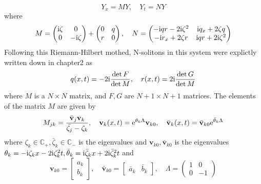 \begin{equation}
    Y_{x} = MY, \quad Y_{t} = NY
\end{equation}
where 
\begin{equation}
    M = \begin{pmatrix}
        \mathrm{i} \zeta & 0 \\
        0 & -\mathrm{i} \zeta
    \end{pmatrix} + \begin{pmatrix}
        0 & q \\
        r & 0
    \end{pmatrix}, 
    \quad N = \begin{pmatrix}
        - \mathrm{i} qr - 2 \mathrm{i} \zeta^{2} & \mathrm{i} q_{x} +2 \zeta q \\
        -\mathrm{i} r_{x} + 2 \zeta r  &  \mathrm{i} q r + 2 \mathrm{i} \zeta^{2}
    \end{pmatrix}
\end{equation}
Following this Riemann-Hilbert mothed, N-solitons in this system were explictly written down in chapter2 as 
\begin{equation}
    q(x,t) = -2 \mathrm{i} \frac{\det F}{\det M}, \quad r(x,t) = 2 \mathrm{i} \frac{\det G}{\det M} \label{eq:soliton-coupled-NLS}
\end{equation}
where $ M $ is a $ N \times N $ matrix, and $ F, G $ are $ N+1 \times N+1 $ matrices. The elements of the matrix $ M $ are given by
\begin{equation}
    M_{jk} = \frac{\bar{\mathbf{v}}_{j}\mathbf{v}_{k}}{\bar{\zeta_{j}}-\zeta_{k}}, \quad \mathbf{v}_{k}(x,t)= \mathrm{e}^{\theta_{k}\Lambda} \mathbf{v}_{k0}, \quad \bar{\mathbf{v}}_{k}(x,t) = \bar{\mathbf{v}}_{k0}\mathrm{e}^{\bar{\theta}_{k}\Lambda} 
\end{equation}
where $\zeta_{k} \in \mathbb{C}_{+}, \bar{\zeta}_{k} \in \mathbb{C}_{-}$ is the eigenvalues and $\mathbf{v}_{k0}, \bar{\mathbf{v}}_{k0}$ is the eigenvalues $ \theta_{k} = -\mathrm{i} \zeta_{k} x - 2 \mathrm{i} \zeta_{k}^{2}t, \bar{\theta}_{k} = \mathrm{i} \bar{\zeta}_{k} x + 2 \mathrm{i} \bar{\zeta}_{k}^{2}t $ and
\begin{equation}
    \mathbf{v}_{k0} = \begin{bmatrix}
        a_{k} \\
        b_{k}
    \end{bmatrix}, \quad \bar{\mathbf{v}}_{k0} = \begin{bmatrix}
        \bar{a}_{k} & \bar{b}_{k}
    \end{bmatrix}, \quad \Lambda = \begin{pmatrix}
        1 & 0 \\
        0 & -1
    \end{pmatrix}
\end{equation}
